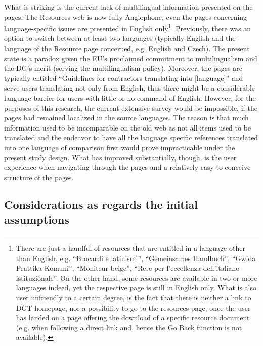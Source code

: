\documentclass[output=paper]{langsci/langscibook}
\begin{document}
What is striking is the current lack of multilingual information presented on the pages. The Resources web is now fully Anglophone, even the pages concerning language-specific issues are presented in English only\footnote{There are just a handful of resources that are entitled in a language other than English, e.g. “Brocardi e latinismi”, “Gemeinsames Handbuch”, “Gwida Prattika Komuni”, “Moniteur belge”, “Rete per l’eccellenza dell’italiano istituzionale”. On the other hand, some resources are available in two or more languages indeed, yet the respective page is still in English only. What is also user unfriendly to a certain degree, is the fact that there is neither a link to DGT homepage, nor a possibility to go to the resources page, once the user has landed on a page offering the download of a specific resource document (e.g. when following a direct link and, hence the Go Back function is not available).}. Previously, there was an option to switch between at least two languages (typically English and the language of the Resource page concerned, e.g. English and Czech). The present state is a paradox given the EU’s proclaimed commitment to multilingualism and the DG’s merit (serving the multilingualism policy). Moreover, the pages are typically entitled “Guidelines for contractors translating into [language]” and serve users translating not only from English, thus there might be a considerable language barrier for users with little or no command of English. However, for the purposes of this research, the current extensive survey would be impossible, if the pages had remained localized in the source languages. The reason is that much information used to be incomparable on the old web as not all items used to be translated and the endeavor to have all the language specific references translated into one language of comparison first would prove impracticable under the present study design. What has improved substantially, though, is the user experience when navigating through the pages and a relatively easy-to-conceive structure of the pages. 

\subsection{Considerations as regards the initial assumptions}\label{sec:svoboda:5.4}
\end{document}
